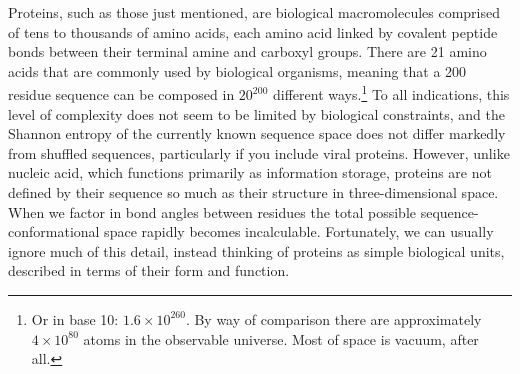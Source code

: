 \documentclass[a4paper,11pt,twoside,openright]{scrbook}
\begin{document}

Proteins, such as those just mentioned, are biological macromolecules comprised of tens to thousands of amino acids, each amino acid linked by covalent peptide bonds between their terminal amine and carboxyl groups. There are 21 amino acids that are commonly used by biological organisms, meaning that a 200 residue sequence can be composed in \(20^{200}\) different ways.\footnote{Or in base 10: \(1.6\times10^{260}\). By way of comparison there are approximately \(4\times10^{80}\) atoms in the observable universe. Most of space is vacuum, after all.} To all indications, this level of complexity does not seem to be limited by biological constraints, and the Shannon entropy of the currently known sequence space does not differ markedly from shuffled sequences, particularly if you include viral proteins. However, unlike nucleic acid, which functions primarily as information storage, proteins are not defined by their sequence so much as their structure in three-dimensional space. When we factor in bond angles between residues the total possible sequence-conformational space rapidly becomes incalculable. Fortunately, we can usually ignore much of this detail, instead thinking of proteins as simple biological units, described in terms of their form and function.
\end{document}
